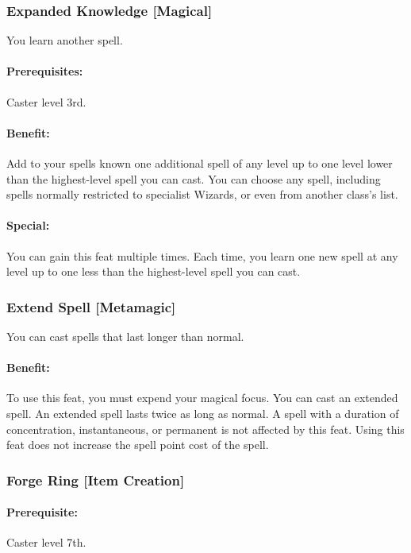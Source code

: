 \subsubsection[Expanded Knowledge]{Expanded Knowledge [Magical]}
\label{Feat:ExpandedKnowledge}
You learn another spell.

\paragraph{Prerequisites:} Caster level 3rd.

\paragraph{Benefit:} Add to your spells known one additional spell of any level up to one level lower than the highest-level spell you can cast. 
You can choose any spell, including spells normally restricted to specialist Wizards, or even from another class's list.

\paragraph{Special:} You can gain this feat multiple times. Each time, you learn one new spell at any level up to one less than the highest-level spell you can cast.

\subsubsection[Extend Spell]{Extend Spell [Metamagic]}
\label{Feat:ExtendSpell}
You can cast spells that last longer than normal.

\paragraph{Benefit:} To use this feat, you must expend your magical focus.
You can cast an extended spell. An extended spell lasts twice as long as normal. 
A spell with a duration of concentration, instantaneous, or permanent is not affected by this feat.
Using this feat does not increase the spell point cost of the spell.

\subsubsection[Forge Ring]{Forge Ring [Item Creation]}
\label{Feat:ForgeRing}
\paragraph{Prerequisite:} 
Caster level 7th.

